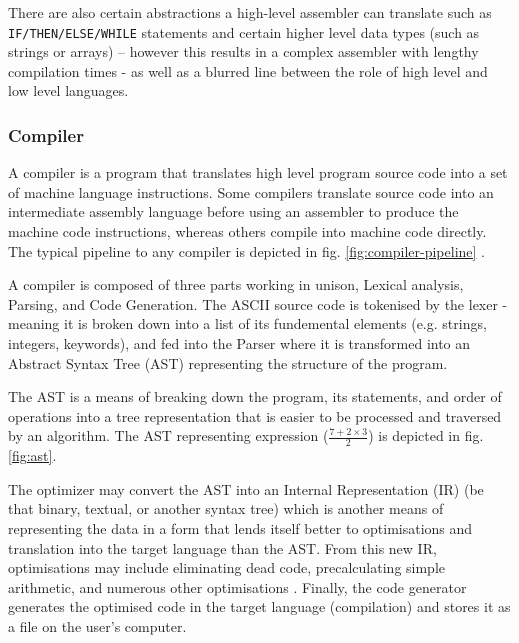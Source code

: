 There are also certain abstractions a high-level assembler can translate such as \texttt{IF/THEN/ELSE/WHILE} statements and certain higher level data types (such as strings or arrays) – however this results in a complex assembler with lengthy compilation times - as well as a blurred line between the role of high level and low level languages. 

\subsubsection{Compiler}
\label{sec:Compiler}
A compiler is a program that translates high level program source code into a set of machine language instructions. Some compilers translate source code into an intermediate assembly language before using an assembler to produce the machine code instructions, whereas others compile into machine code directly. The typical pipeline to any compiler is depicted in fig. \ref{fig:compiler-pipeline} \textcite{Ball-WritingACompilerInGo}.

\bigskip

\begin{figure}%
    \centering
    \qquad
\end{figure}

\bigskip


A compiler is composed of three parts working in unison, Lexical analysis, Parsing, and Code Generation. The ASCII source code is tokenised by the lexer - meaning it is broken down into a list of its fundemental elements (e.g. strings, integers, keywords), and fed into the Parser where it is transformed into an Abstract Syntax Tree (AST) representing the structure of the program. 

The AST is a means of breaking down the program, its statements, and order of operations into a tree representation that is easier to be processed and traversed by an algorithm. The AST representing expression ($\frac{7+2\times3}{2}$) is depicted in fig. \ref{fig:ast}. 

The optimizer may convert the AST into an Internal Representation (IR) (be that binary, textual, or another syntax tree) which is another means of representing the data in a form that lends itself better to optimisations and translation into the target language than the AST. From this new IR, optimisations may include eliminating dead code, precalculating simple arithmetic, and numerous other optimisations \textcite{Ball-WritingACompilerInGo}. Finally, the code generator generates the optimised code in the target language (compilation) and stores it as a file on the user's computer.



